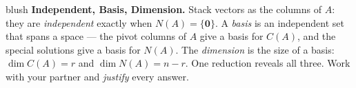 \documentclass[10pt]{article}
\newcommand{\zero}{\mathbf{0}}
\begin{document}
\namepartnerperiod

\vspace{0.10in}

\begin{headlinebox}{blush}
\small\textbf{Independent, Basis, Dimension.} Stack vectors as the columns of $A$: they are
\emph{independent} exactly when $N(A)=\{\zero\}$. A \emph{basis} is an independent set that spans a space
--- the pivot columns of $A$ give a basis for $C(A)$, and the special solutions give a basis for $N(A)$.
The \emph{dimension} is the size of a basis: $\dim C(A)=r$ and $\dim N(A)=n-r$. One reduction reveals all
three. Work with your partner and \emph{justify} every answer.
\end{headlinebox}

\vspace{0.10in}
\end{document}
